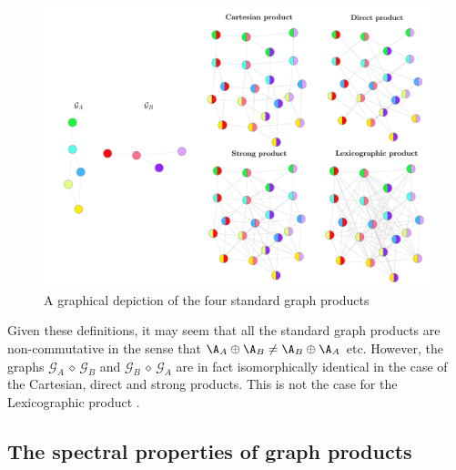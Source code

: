 \begin{figure}[t]
    \begin{center}
        \includegraphics[width=0.95\linewidth]{Figures/product_graphs.pdf}
    \end{center}
    \caption[Graphical depiction of the standard graph products]{A graphical depiction of the four standard graph products}
    \label{fig:graph_products}
\end{figure}




Given these definitions, it may seem that all the standard graph products are non-commutative in the sense that $\A_A \oplus \A_B  \neq \A_B \oplus \A_A $ etc. However, the graphs $\mathcal{G}_A \, \diamond \, \mathcal{G}_B$ and $\mathcal{G}_B \, \diamond \, \mathcal{G}_A$ are in fact isomorphically identical in the case of the Cartesian, direct and strong products. This is not the case for the Lexicographic product \citep{Imrich2000}.

\subsection{The spectral properties of graph products}

